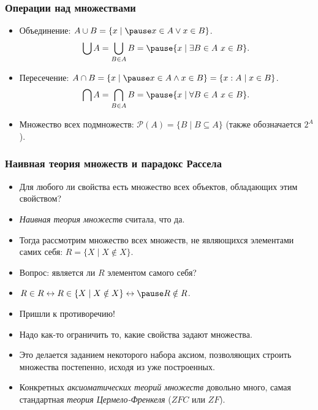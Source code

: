 \documentclass[10pt]{beamer}
\begin{document}
\begin{frame}
    \frametitle{Операции над множествами}
    \begin{itemize}
        \item Объединение: $A \cup B = \{x \mid \pause x \in A \lor x \in B\}$. \[\bigcup A = \bigcup_{B \in A} B = \pause \{x \mid \exists B \in A~x \in B\}.\]
        \item Пересечение: $A \cap B = \{x \mid \pause x \in A \land x \in B\} = \{x : A \mid x \in B\}$. \[\bigcap A = \bigcap_{B \in A} B = \pause \{x \mid \forall B \in A~x \in B\}.\]
        \item Множество всех подмножеств: $\mathcal{P}(A) = \{ B \mid B \subseteq A \}$ (также обозначается $2^A$).
    \end{itemize}
\end{frame}

\begin{frame}
    \frametitle{Наивная теория множеств и парадокс Рассела}
    \begin{itemize}
        \item Для любого ли свойства есть множество всех объектов, обладающих этим свойством?
        \item \emph{Наивная теория множеств} считала, что да.
        \item Тогда рассмотрим множество всех множеств, не являющихся элементами самих себя: $R = \{X \mid X \notin X\}$.
        \item Вопрос: является ли $R$ элементом самого себя?
        \pause
        \item $R \in R \leftrightarrow R \in \{X \mid X \notin X\} \leftrightarrow \pause R \notin R$.
        \item Пришли к противоречию!
        \pause
        \item Надо как-то ограничить то, какие свойства задают множества.
        \item Это делается заданием некоторого набора аксиом, позволяющих строить множества постепенно, исходя из уже построенных.
        \item Конкретных \emph{аксиоматических теорий множеств} довольно много, самая стандартная \emph{теория Цермело-Френкеля} ($ZFC$ или $ZF$). 
    \end{itemize}
\end{frame}
\end{document}
